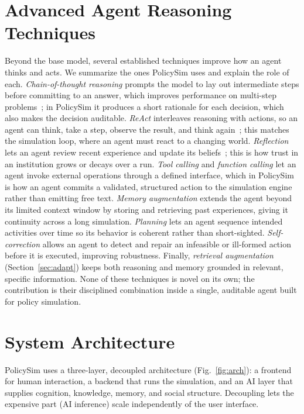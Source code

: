 \documentclass[conference]{IEEEtran}
\begin{document}
\section{Advanced Agent Reasoning Techniques}
\label{sec:techniques}

Beyond the base model, several established techniques improve how an agent thinks and acts. We summarize the ones PolicySim uses and explain the role of each. \emph{Chain-of-thought reasoning} prompts the model to lay out intermediate steps before committing to an answer, which improves performance on multi-step problems~\cite{wei2022}; in PolicySim it produces a short rationale for each decision, which also makes the decision auditable. \emph{ReAct} interleaves reasoning with actions, so an agent can think, take a step, observe the result, and think again~\cite{yao2023}; this matches the simulation loop, where an agent must react to a changing world. \emph{Reflection} lets an agent review recent experience and update its beliefs~\cite{shinn2023}; this is how trust in an institution grows or decays over a run. \emph{Tool calling} and \emph{function calling} let an agent invoke external operations through a defined interface, which in PolicySim is how an agent commits a validated, structured action to the simulation engine rather than emitting free text. \emph{Memory augmentation} extends the agent beyond its limited context window by storing and retrieving past experiences, giving it continuity across a long simulation. \emph{Planning} lets an agent sequence intended activities over time so its behavior is coherent rather than short-sighted. \emph{Self-correction} allows an agent to detect and repair an infeasible or ill-formed action before it is executed, improving robustness. Finally, \emph{retrieval augmentation} (Section~\ref{sec:adapt}) keeps both reasoning and memory grounded in relevant, specific information. None of these techniques is novel on its own; the contribution is their disciplined combination inside a single, auditable agent built for policy simulation.

\section{System Architecture}
\label{sec:arch}

PolicySim uses a three-layer, decoupled architecture (Fig.~\ref{fig:arch}): a frontend for human interaction, a backend that runs the simulation, and an AI layer that supplies cognition, knowledge, memory, and social structure. Decoupling lets the expensive part (AI inference) scale independently of the user interface.
\end{document}

